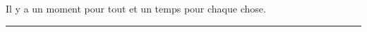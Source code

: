 %
    {Il y a un moment pour tout et un temps pour chaque chose.}%
    {}
    

\bigskip
\hrule
\newpage

